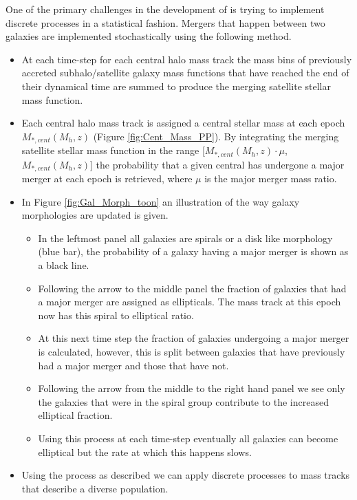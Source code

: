 One of the primary challenges in the development of \steel is trying to implement discrete processes in a statistical fashion. Mergers that happen between two galaxies are implemented stochastically using the following method.
\begin{itemize}
    \item At each time-step for each central halo mass track the mass bins of previously accreted subhalo/satellite galaxy mass functions that have reached the end of their dynamical time are summed to produce the merging satellite stellar mass function. 
    \item Each central halo mass track is assigned a central stellar mass at each epoch $M_{*,cent}(M_{h}, z)$ (Figure \ref{fig:Cent_Mass_PP}). By integrating the merging satellite stellar mass function in the range [$M_{*,cent}(M_{h}, z) \cdot \mu$, $M_{*,cent}(M_{h}, z)$] the probability that a given central has undergone a major merger at each epoch is retrieved, where $\mu$ is the major merger mass ratio. 
    \item In Figure \ref{fig:Gal_Morph_toon} an illustration of the way galaxy morphologies are updated is given. 
    \begin{itemize}
        \item In the leftmost panel all galaxies are spirals or a disk like morphology (blue bar), the probability of a galaxy having a major merger is shown as a black line.
        \item Following the arrow to the middle panel the fraction of galaxies that had a major merger are assigned as ellipticals. The mass track at this epoch now has this spiral to elliptical ratio.
        \item At this next time step the fraction of galaxies undergoing a major merger is calculated, however, this is split between galaxies that have previously had a major merger and those that have not. 
        \item Following the arrow from the middle to the right hand panel we see only the galaxies that were in the spiral group contribute to the increased elliptical fraction.
        \item Using this process at each time-step eventually all galaxies can become elliptical but the rate at which this happens slows.
    \end{itemize}
    \item Using the process as described we can apply discrete processes to mass tracks that describe a diverse population.
\end{itemize}

